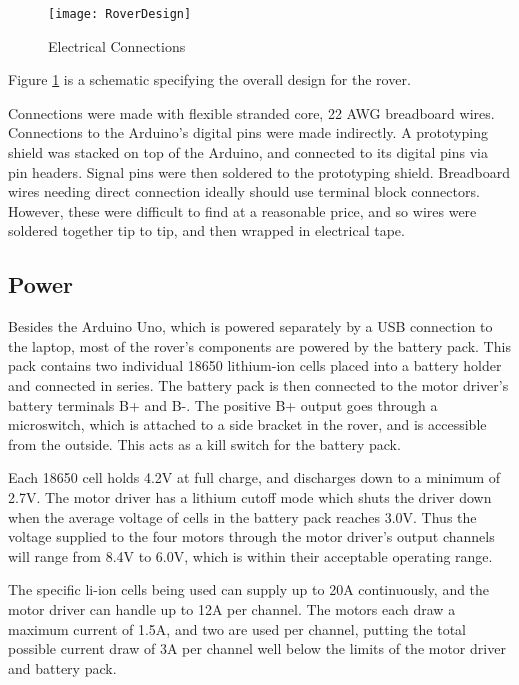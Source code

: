 \begin{figure}[p] 
	\caption{Electrical Connections}
	\texttt{[image: RoverDesign]}
	\centering
	\label{figRoverDesign}
\end{figure}

Figure \ref{figRoverDesign} is a schematic specifying the overall design for the rover.

Connections were made with flexible stranded core, 22 AWG breadboard wires. Connections to the Arduino's digital pins were made indirectly. A prototyping shield was stacked on top of the Arduino, and connected to its digital pins via pin headers. Signal pins were then soldered to the prototyping shield. Breadboard wires needing direct connection ideally should use terminal block connectors. However, these were difficult to find at a reasonable price, and so wires were soldered together tip to tip, and then wrapped in electrical tape.

\subsection{Power}
Besides the Arduino Uno, which is powered separately by a USB connection to the laptop, most of the rover's components are powered by the battery pack. This pack contains two individual 18650 lithium-ion cells placed into a battery holder and connected in series. The battery pack is then connected to the motor driver's battery terminals B+ and B-. The positive B+ output goes through a microswitch, which is attached to a side bracket in the rover, and is accessible from the outside. This acts as a kill switch for the battery pack.

Each 18650 cell holds 4.2V at full charge, and discharges down to a minimum of 2.7V. The motor driver has a lithium cutoff mode which shuts the driver down when the average voltage of cells in the battery pack reaches 3.0V. Thus the voltage supplied to the four motors through the motor driver's output channels will range from 8.4V to 6.0V, which is within their acceptable operating range.

The specific li-ion cells being used can supply up to 20A continuously, and the motor driver can handle up to 12A per channel. The motors each draw a maximum current of 1.5A, and two are used per channel, putting the total possible current draw of 3A per channel well below the limits of the motor driver and battery pack.

